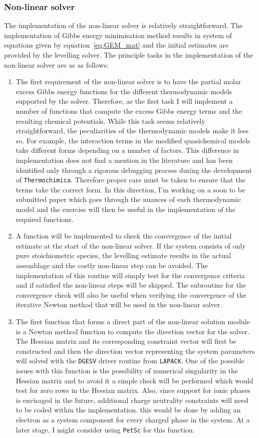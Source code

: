 	\subsubsection{Non-linear solver}
		The implementation of the non-linear solver is relatively straightforward. The implementation of Gibbs energy minimisation method results in system of equations given by equation~\eqref{eq:GEM_mat} and the initial estimates are provided by the levelling solver. The principle tasks in the implementation of the non-linear solver are as as follows:
		\begin{enumerate}
			\item The first requirement of the non-linear solver is to have the partial molar excess Gibbs energy functions for the different thermodynamic  models supported by the solver. Therefore, as the first task I will implement a number of functions that compute the excess Gibbs energy terms and the resulting chemical potentials. While this task seems relatively straightforward, the peculiarities of the thermodynamic models make it less so. For example, the interaction terms in the modified quasichemical models take different forms depending on a number of factors. This difference in implementation does not find a mention in the literature and has been identified only through a rigorous debugging process during the development of \texttt{Thermochimica}. Therefore proper care must be taken to ensure that the terms take the correct form. In this direction, I'm working on a soon to be submitted paper which goes through the nuances of each thermodynamic model and the exercise will then be useful in the implementation of the required functions. 
			\item	A function will be implemented to check the convergence of the initial estimate at the start of the non-linear solver. If the system consists of only pure stoichiometric species, the levelling estimate results in the actual assemblage and the costly non-linear step can be avoided. The implementation of this routine will simply test for the convergence criteria and if satisfied the non-linear steps will be skipped. The subroutine for the convergence check will also be useful when verifying the convergence of the iterative Newton method that will be used in the non-linear solver.
			\item The first function that forms a direct part of the non-linear solution module is a Newton method function to compute the direction vector for the solver. The Hessian matrix and its corresponding constraint vector will first be constructed and then the direction vector representing the system parameters will solved with the \texttt{DGESV} driver routine from \texttt{LAPACK}.  One of the possible issues with this function is the possibility of numerical singularity in the Hessian matrix and to avoid it a simple check will be performed which would test for zero rows in the Hessian matrix. Also, since support for ionic phases is envisaged in the future, additional charge neutrality constraints will need to be coded within the implementation. this would be done by adding an electron as a system component for every charged phase in the system. At a later stage, I might consider using \texttt{PetSc} for this function.

\end{enumerate}
